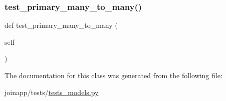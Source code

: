 \subsubsection{\texorpdfstring{test\_primary\_many\_to\_many()}{test\_primary\_many\_to\_many()}}
{\footnotesize\ttfamily def test\+\_\+primary\+\_\+many\+\_\+to\+\_\+many (\begin{DoxyParamCaption}\item[{}]{self }\end{DoxyParamCaption})}



The documentation for this class was generated from the following file\+:\begin{DoxyCompactItemize}
\item 
joinapp/tests/\mbox{\hyperlink{tests__models_8py}{tests\+\_\+models.\+py}}\end{DoxyCompactItemize}
